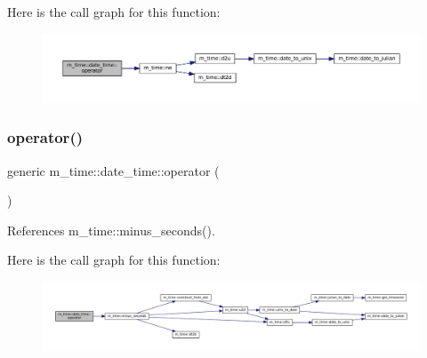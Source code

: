 Here is the call graph for this function\+:\nopagebreak
\begin{figure}[H]
\begin{center}
\leavevmode
\includegraphics[width=350pt]{structm__time_1_1date__time_af93a94ed420ca7ba08cc63c36e88459c_cgraph}
\end{center}
\end{figure}
\mbox{\label{structm__time_1_1date__time_affafbae65afa1e12c901241e641e4b1f}} 
\subsubsection{\texorpdfstring{operator()}{operator()}\hspace{0.1cm}{\footnotesize\ttfamily [8/9]}}
{\footnotesize\ttfamily generic m\+\_\+time\+::date\+\_\+time\+::operator (\begin{DoxyParamCaption}{ }\end{DoxyParamCaption})\hspace{0.3cm}{\ttfamily [private]}}



References m\+\_\+time\+::minus\+\_\+seconds().

Here is the call graph for this function\+:\nopagebreak
\begin{figure}[H]
\begin{center}
\leavevmode
\includegraphics[width=350pt]{structm__time_1_1date__time_affafbae65afa1e12c901241e641e4b1f_cgraph}
\end{center}
\end{figure}
\mbox{\label{structm__time_1_1date__time_adc11c2984fd9dae163e44627a5e2a134}} 
